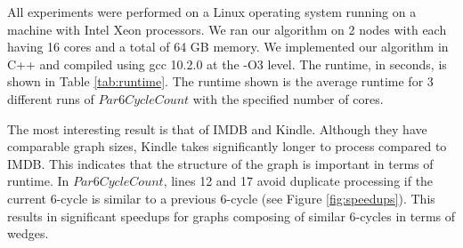 \documentclass[11pt]{article}
\begin{document}
\begin{table}[h]
  \caption{New Runtime (seconds, 4 sockets)}
  \label{tab:runtimenew}
  \centering
\end{table}

All experiments were performed on a Linux operating system running on a machine with Intel Xeon processors.
We ran our algorithm on 2 nodes with each having 16 cores and a total of 64 GB memory.
We implemented our algorithm in C++ and compiled using gcc 10.2.0 at the -O3 level.
The runtime, in seconds, is shown in Table \ref{tab:runtime}.
The runtime shown is the average runtime for 3 different runs of $Par6CycleCount$ with the specified number of cores.

The most interesting result is that of IMDB and Kindle.
Although they have comparable graph sizes, Kindle takes significantly longer to process compared to IMDB.
This indicates that the structure of the graph is important in terms of runtime.
In $Par6CycleCount$, lines 12 and 17 avoid duplicate processing if the current 6-cycle is similar to a previous 6-cycle (see Figure \ref{fig:speedups}).
This results in significant speedups for graphs composing of similar 6-cycles in terms of wedges.
\end{document}
